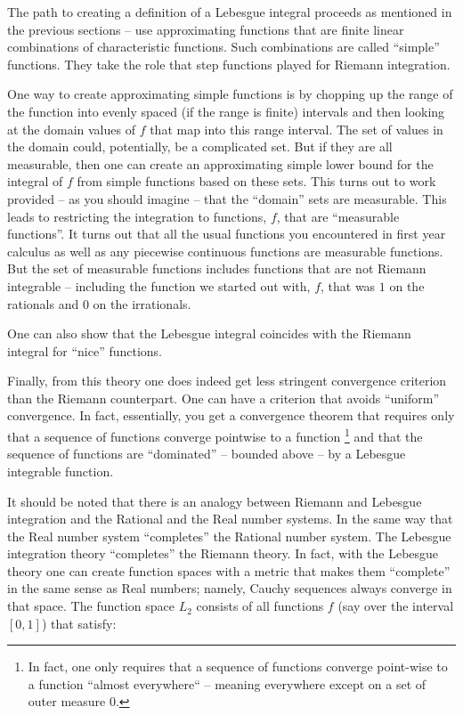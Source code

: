 \documentclass{article}
\begin{document}
The path to creating a definition of a Lebesgue integral proceeds as mentioned 
in the previous sections -- use approximating functions that are finite linear
combinations of characteristic functions. Such combinations are called ``simple''
functions. They take the role that step functions played for Riemann integration. 

One way to create approximating simple functions is by chopping up the range 
of the function into evenly spaced (if the range is finite) intervals and then 
looking at the domain values of $f$ that map into this range interval. 
The set of values in the domain could, potentially, be a complicated set. 
But if they are all measurable, then one can create an approximating simple 
lower bound for the integral of $f$ from simple functions based on these sets. 
This turns out to work provided -- as you should imagine -- that the ``domain'' 
sets are measurable. This leads to restricting the integration to functions, $f$, 
that are ``measurable functions''. It turns out that all the usual functions you 
encountered in first year calculus as well as any piecewise continuous functions 
are measurable functions. But the set of measurable functions includes functions 
that are not Riemann integrable -- including the function we started out with, $f$, 
that was $1$ on the rationals and $0$ on the irrationals.

One can also show that the Lebesgue integral coincides with the Riemann integral 
for ``nice'' functions.

Finally, from this theory one does indeed get less stringent convergence 
criterion than the Riemann counterpart. One can have a criterion that avoids 
``uniform'' convergence. In fact, essentially, you get a convergence theorem 
that requires only that a sequence of functions converge pointwise to a function%
\footnote{In fact, one only requires that a sequence of functions converge point-wise 
to a function ``almost everywhere`` -- meaning everywhere except on a set of 
outer measure $0$.} and that the sequence of functions 
are ``dominated'' -- bounded above -- by a Lebesgue integrable function.

It should be noted that there is an analogy between Riemann and Lebesgue integration 
and the Rational and the Real number systems. In the same way that the Real number 
system ``completes'' the Rational number system. The Lebesgue integration 
theory ``completes'' the Riemann theory. In fact, with the Lebesgue theory 
one can create function spaces with a metric that makes them ``complete'' 
in the same sense as Real numbers; namely, Cauchy sequences always converge 
in that space. The function space $L_2$ consists of all functions $f$ 
(say over the interval $[0,1]$) that satisfy:
\end{document}
